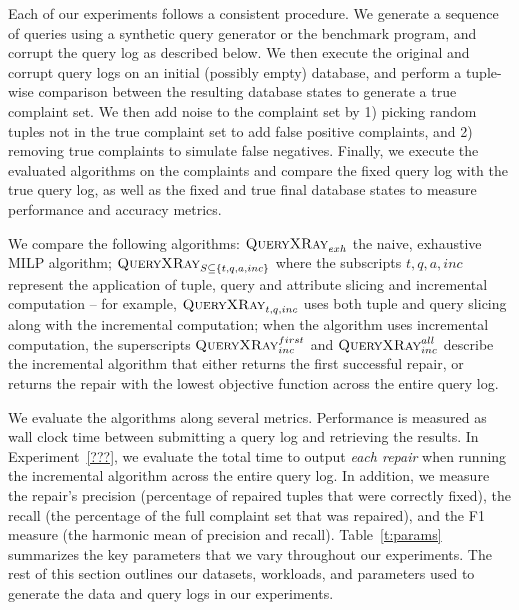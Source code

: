 
Each of our experiments follows a consistent procedure. 
We generate a sequence of queries using a synthetic query generator or 
the benchmark program, and corrupt the query log as described below. 
We then execute the original and corrupt query logs on an initial (possibly empty) database,
and perform a tuple-wise comparison between the resulting database states 
to generate a true complaint set.  
We then add noise to the complaint set by 1) picking random tuples not in the true
complaint set to add false positive complaints, and 2) removing true complaints to simulate false negatives.
Finally, we execute the evaluated algorithms on the complaints and compare the fixed
query log with the true query log, as well as the fixed and true
final database states to measure performance and accuracy metrics.

We compare the following algorithms:
$\textsc{QueryXRay}_{exh}$ the naive, exhaustive MILP algorithm; 
$\textsc{QueryXRay}_{S \subseteq \{t,q,a,inc\}}$ where the subscripts $t,q,a,inc$ represent the
application of tuple, query and attribute slicing and incremental computation -- 
for example, $\textsc{QueryXRay}_{t,q,inc}$ uses both tuple and query slicing along with the incremental computation; 
when the algorithm uses incremental computation, the superscripts $\textsc{QueryXRay}_{inc}^{first}$
and $\textsc{QueryXRay}_{inc}^{all}$ describe the incremental algorithm that either returns the first successful repair,
or returns the repair with the lowest objective function across the entire query log.

We evaluate the algorithms along several metrics.  Performance is measured as wall clock
time between submitting a query log and retrieving the results.  In Experiment~\ref{???},
we evaluate the total time to output {\it each repair} when running the incremental algorithm
across the entire query log.  In addition, we measure the repair's precision (percentage of
repaired tuples that were correctly fixed), the recall (the percentage of the full complaint set that was 
repaired), and the F1 measure (the harmonic mean of precision and recall).
Table~\ref{t:params} summarizes the key parameters that we vary throughout our experiments.  
The rest of this section outlines our datasets, workloads, and parameters used to generate the data 
and query logs in our experiments.

